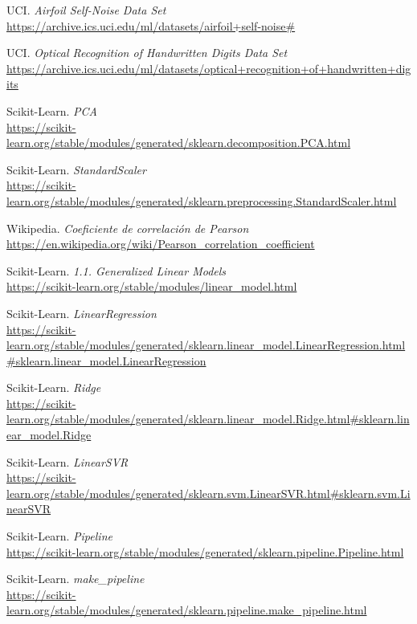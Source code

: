\documentclass[11pt,a4paper]{article}
\begin{document}
\begin{thebibliography}{22}

UCI. \textit{Airfoil Self-Noise Data Set}
\\\url{https://archive.ics.uci.edu/ml/datasets/airfoil+self-noise#}

UCI. \textit{Optical Recognition of Handwritten Digits Data Set}
\\\url{https://archive.ics.uci.edu/ml/datasets/optical+recognition+of+handwritten+digits}

Scikit-Learn. \textit{PCA}
\\\url{https://scikit-learn.org/stable/modules/generated/sklearn.decomposition.PCA.html}

Scikit-Learn. \textit{StandardScaler}
\\\url{https://scikit-learn.org/stable/modules/generated/sklearn.preprocessing.StandardScaler.html}

Wikipedia. \textit{Coeficiente de correlación de Pearson}
\\\url{https://en.wikipedia.org/wiki/Pearson_correlation_coefficient}

Scikit-Learn. \textit{1.1. Generalized Linear Models}
\\\url{https://scikit-learn.org/stable/modules/linear_model.html}

Scikit-Learn. \textit{LinearRegression}
\\\url{https://scikit-learn.org/stable/modules/generated/sklearn.linear_model.LinearRegression.html#sklearn.linear_model.LinearRegression}

Scikit-Learn. \textit{Ridge}
\\\url{https://scikit-learn.org/stable/modules/generated/sklearn.linear_model.Ridge.html#sklearn.linear_model.Ridge}

Scikit-Learn. \textit{LinearSVR}
\\\url{https://scikit-learn.org/stable/modules/generated/sklearn.svm.LinearSVR.html#sklearn.svm.LinearSVR}

Scikit-Learn. \textit{Pipeline}
\\\url{https://scikit-learn.org/stable/modules/generated/sklearn.pipeline.Pipeline.html}

Scikit-Learn. \textit{make\_pipeline}
\\\url{https://scikit-learn.org/stable/modules/generated/sklearn.pipeline.make_pipeline.html}


\end{thebibliography}
\end{document}
